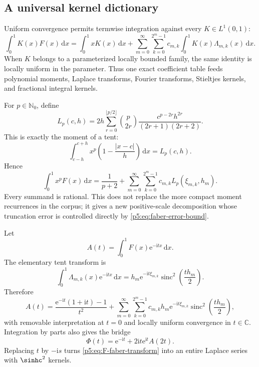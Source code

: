 \documentclass[11pt,oneside]{article}
\theoremstyle{definition}
\newcommand{\dd}{\,\mathrm d}
\newcommand{\e}{\mathrm e}
\newcommand{\ii}{\mathrm i}
\newcommand{\C}{\mathbb C}
\newcommand{\N}{\mathbb N}
\newcommand{\sinc}{\operatorname{sinc}}
\begin{document}
\subsection{A universal kernel dictionary}

Uniform convergence permits termwise integration against every
$K\in L^1(0,1)$:
\begin{equation}
 \int_0^1K(x)F(x)\dd x
 =\int_0^1xK(x)\dd x
 +\sum_{m=0}^\infty\sum_{k=0}^{2^m-1}
 c_{m,k}\int_0^1K(x)\Lambda_{m,k}(x)\dd x.               \label{p5:eq:faber-kernel-dictionary}
\end{equation}
When $K$ belongs to a parameterized locally bounded family, the same identity
is locally uniform in the parameter.  Thus one exact coefficient table feeds
polynomial moments, Laplace transforms, Fourier transforms, Stieltjes
kernels, and fractional integral kernels.

For $p\in\N_0$, define
\begin{equation}
 L_p(c,h)=2h\sum_{r=0}^{\lfloor p/2\rfloor}
 \binom{p}{2r}\frac{c^{p-2r}h^{2r}}{(2r+1)(2r+2)}.       \label{p5:eq:tent-moment}
\end{equation}
This is exactly the moment of a tent:
\begin{equation}
 \int_{c-h}^{c+h}x^p\left(1-\frac{|x-c|}{h}\right)\dd x
 =L_p(c,h).                                              \label{p5:eq:tent-moment-integral}
\end{equation}
Hence
\begin{equation}
 \boxed{\displaystyle
 \int_0^1x^pF(x)\dd x
 =\frac1{p+2}+
 \sum_{m=0}^\infty\sum_{k=0}^{2^m-1}
 c_{m,k}L_p(\xi_{m,k},h_m).}                             \label{p5:eq:faber-polynomial-moment}
\end{equation}
Every summand is rational.  This does not replace the more compact moment
recurrences in the corpus; it gives a new positive-scale decomposition whose
truncation error is controlled directly by \eqref{p5:eq:faber-error-bound}.

Let
\begin{equation}
 A(t)=\int_0^1F(x)\e^{-\ii tx}\dd x.                     \label{p5:eq:A-definition}
\end{equation}
The elementary tent transform is
\begin{equation}
 \int_0^1\Lambda_{m,k}(x)\e^{-\ii tx}\dd x
 =h_m\e^{-\ii t\xi_{m,k}}
   \sinc^2\!\left(\frac{th_m}{2}\right).                \label{p5:eq:tent-transform}
\end{equation}
Therefore
\begin{equation}
 \boxed{\displaystyle
 A(t)=\frac{\e^{-\ii t}(1+\ii t)-1}{t^2}
 +\sum_{m=0}^\infty\sum_{k=0}^{2^m-1}
 c_{m,k}h_m\e^{-\ii t\xi_{m,k}}
 \sinc^2\!\left(\frac{th_m}{2}\right),}                \label{p5:eq:F-faber-transform}
\end{equation}
with removable interpretation at $t=0$ and locally uniform convergence in
$t\in\C$.  Integration by parts also gives the bridge
\begin{equation}
 \Phi(t)=\e^{-\ii t}+2\ii t\e^{\ii t}A(2t).             \label{p5:eq:A-Phi-bridge}
\end{equation}
Replacing $t$ by $-\ii s$ turns \eqref{p5:eq:F-faber-transform} into an entire
Laplace series with $\sinhc^2$ kernels.
\end{document}
